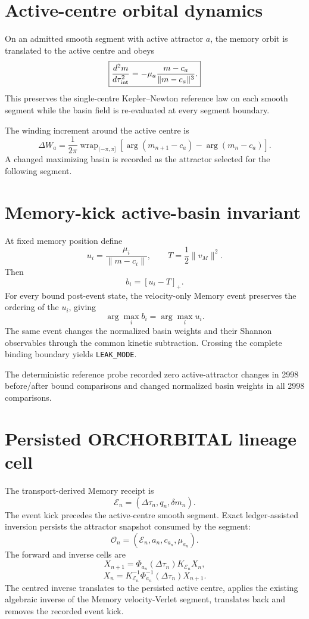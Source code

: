 \documentclass[11pt]{book}
\begin{document}
\section{Active-centre orbital dynamics}

On an admitted smooth segment with active attractor \(a\), the memory orbit is translated to the active centre and obeys
\[
\boxed{
\frac{d^2m}{d\tau_{\rm int}^2}
=-\mu_a\frac{m-c_a}{\|m-c_a\|^3}.
}
\]
This preserves the single-centre Kepler--Newton reference law on each smooth segment while the basin field is re-evaluated at every segment boundary.

The winding increment around the active centre is
\[
\boxed{
\Delta W_a
=\frac{1}{2\pi}
\operatorname{wrap}_{(-\pi,\pi]}
\left[
\arg(m_{n+1}-c_a)-\arg(m_n-c_a)
\right].
}
\]
A changed maximizing basin is recorded as the attractor selected for the following segment.

\section{Memory-kick active-basin invariant}

At fixed memory position define
\[
u_i=\frac{\mu_i}{\|m-c_i\|},
\qquad
T=\frac12\|v_M\|^2.
\]
Then
\[
\boxed{b_i=[u_i-T]_+.}
\]
For every bound post-event state, the velocity-only Memory event preserves the ordering of the \(u_i\), giving
\[
\boxed{
\arg\max_i b_i=\arg\max_i u_i.
}
\]
The same event changes the normalized basin weights and their Shannon observables through the common kinetic subtraction. Crossing the complete binding boundary yields \texttt{LEAK\_MODE}.

The deterministic reference probe recorded zero active-attractor changes in 2998 before/after bound comparisons and changed normalized basin weights in all 2998 comparisons.

\section{Persisted ORCHORBITAL lineage cell}

The transport-derived Memory receipt is
\[
\mathcal E_n=(\Delta\tau_n,q_n,\delta m_n).
\]
The event kick precedes the active-centre smooth segment. Exact ledger-assisted inversion persists the attractor snapshot consumed by the segment:
\[
\boxed{
\mathcal O_n=(\mathcal E_n,a_n,c_{a_n},\mu_{a_n}).
}
\]
The forward and inverse cells are
\[
\boxed{
X_{n+1}=\Phi_{a_n}(\Delta\tau_n)K_{\mathcal E_n}X_n,
}
\]
\[
\boxed{
X_n=K_{\mathcal E_n}^{-1}\Phi_{a_n}^{-1}(\Delta\tau_n)X_{n+1}.
}
\]
The centred inverse translates to the persisted active centre, applies the existing algebraic inverse of the Memory velocity-Verlet segment, translates back and removes the recorded event kick.
\end{document}
